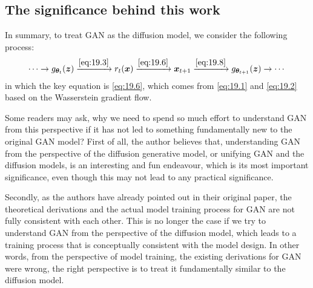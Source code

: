 \subsection{The significance behind this work}
In summary, to treat GAN as the diffusion model, we consider the following process:
\begin{equation}
    \cdots\to g_{\bm{\theta}_t}(\bm{z}) \xrightarrow{\mbox{\cref{eq:19.3}}} r_t(\x)\xrightarrow{\mbox{\cref{eq:19.6}}} \x_{t+1} \xrightarrow{\mbox{\cref{eq:19.8}}} g_{\bm{\theta}_{t+1}}(\bm{z})\to\cdots
\end{equation}
in which the key equation is \cref{eq:19.6}, which comes from \cref{eq:19.1} and \cref{eq:19.2} based on the Wasserstein gradient flow. 

Some readers may ask, why we need to spend so much effort to understand GAN from this perspective if it has not led to something fundamentally new to the original GAN model? First of all, the author believes that, understanding GAN from the perspective of the diffusion generative model, or unifying GAN and the diffusion models, is an interesting and fun endeavour, which is its most important significance, even though this may not lead to any practical significance.

Secondly, as the authors have already pointed out in their original paper, the theoretical derivations and the actual model training process for GAN are not fully consistent with each other. This is no longer the case if we try to understand GAN from the perspective of the diffusion model, which leads to a training process that is conceptually consistent with the model design. In other words, from the perspective of model training, the existing derivations for GAN were wrong, the right perspective is to treat it fundamentally similar to the diffusion model.

